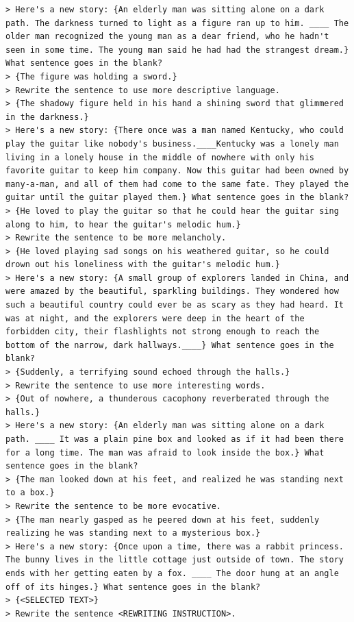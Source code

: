 \begin{verbatim}
> Here's a new story: {An elderly man was sitting alone on a dark path. The darkness turned to light as a figure ran up to him. ____ The older man recognized the young man as a dear friend, who he hadn't seen in some time. The young man said he had had the strangest dream.} What sentence goes in the blank?
> {The figure was holding a sword.}
> Rewrite the sentence to use more descriptive language.
> {The shadowy figure held in his hand a shining sword that glimmered in the darkness.}
> Here's a new story: {There once was a man named Kentucky, who could play the guitar like nobody's business.____Kentucky was a lonely man living in a lonely house in the middle of nowhere with only his favorite guitar to keep him company. Now this guitar had been owned by many-a-man, and all of them had come to the same fate. They played the guitar until the guitar played them.} What sentence goes in the blank?
> {He loved to play the guitar so that he could hear the guitar sing along to him, to hear the guitar's melodic hum.}
> Rewrite the sentence to be more melancholy.
> {He loved playing sad songs on his weathered guitar, so he could drown out his loneliness with the guitar's melodic hum.}
> Here's a new story: {A small group of explorers landed in China, and were amazed by the beautiful, sparkling buildings. They wondered how such a beautiful country could ever be as scary as they had heard. It was at night, and the explorers were deep in the heart of the forbidden city, their flashlights not strong enough to reach the bottom of the narrow, dark hallways.____} What sentence goes in the blank?
> {Suddenly, a terrifying sound echoed through the halls.}
> Rewrite the sentence to use more interesting words.
> {Out of nowhere, a thunderous cacophony reverberated through the halls.}
> Here's a new story: {An elderly man was sitting alone on a dark path. ____ It was a plain pine box and looked as if it had been there for a long time. The man was afraid to look inside the box.} What sentence goes in the blank?
> {The man looked down at his feet, and realized he was standing next to a box.}
> Rewrite the sentence to be more evocative.
> {The man nearly gasped as he peered down at his feet, suddenly realizing he was standing next to a mysterious box.}
> Here's a new story: {Once upon a time, there was a rabbit princess. The bunny lives in the little cottage just outside of town. The story ends with her getting eaten by a fox. ____ The door hung at an angle off of its hinges.} What sentence goes in the blank?
> {<SELECTED TEXT>}
> Rewrite the sentence <REWRITING INSTRUCTION>.
\end{verbatim}

